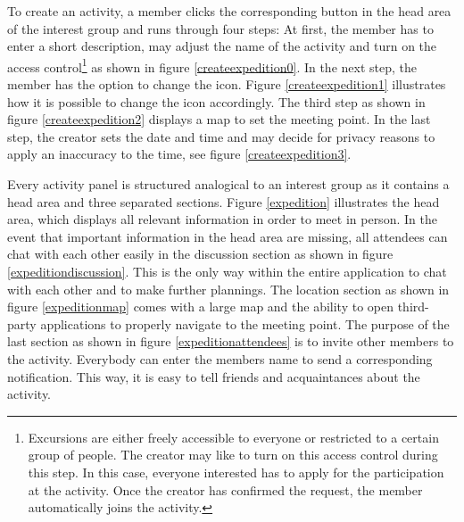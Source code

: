 \documentclass[12pt,numbers=noenddot,parskip,bibliography=totocnumbered,listof=totocnumbered]{scrreprt}
\begin{document}
To create an activity, a member clicks the corresponding button in the head area of the interest group and runs through four steps: At first, the member has to enter a short description, may adjust the name of the activity and turn on the access control\footnote{Excursions are either freely accessible to everyone or restricted to a certain group of people. The creator may like to turn on this access control during this step. In this case, everyone interested has to apply for the participation at the activity. Once the creator has confirmed the request, the member automatically joins the activity.} as shown in figure \ref{createexpedition0}. In the next step, the member has the option to change the icon. Figure \ref{createexpedition1} illustrates how it is possible to change the icon accordingly. The third step as shown in figure \ref{createexpedition2} displays a map to set the meeting point. In the last step, the creator sets the date and time and may decide for privacy reasons to apply an inaccuracy to the time, see figure \ref{createexpedition3}.

Every activity panel is structured analogical to an interest group as it contains a head area and three separated sections. Figure \ref{expedition} illustrates the head area, which displays all relevant information in order to meet in person. In the event that important information in the head area are missing, all attendees can chat with each other easily in the discussion section as shown in figure \ref{expeditiondiscussion}. This is the only way within the entire application to chat with each other and to make further plannings. The location section as shown in figure \ref{expeditionmap} comes with a large map and the ability to open third-party applications to properly navigate to the meeting point. The purpose of the last section as shown in figure \ref{expeditionattendees} is to invite other members to the activity. Everybody can enter the members name to send a corresponding notification. This way, it is easy to tell friends and acquaintances about the activity.
\end{document}
